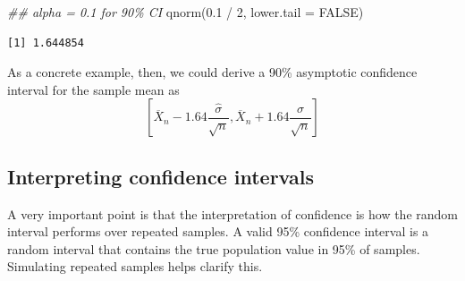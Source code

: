 \documentclass[
  13pt,
  letterpaper,
  DIV=11,
  numbers=noendperiod]{scrreprt}
\newenvironment{Shaded}{\begin{snugshade}}{\end{snugshade}}
\newcommand{\AttributeTok}[1]{\textcolor[rgb]{0.40,0.45,0.13}{#1}}
\newcommand{\ConstantTok}[1]{\textcolor[rgb]{0.56,0.35,0.01}{#1}}
\newcommand{\DecValTok}[1]{\textcolor[rgb]{0.68,0.00,0.00}{#1}}
\newcommand{\DocumentationTok}[1]{\textcolor[rgb]{0.37,0.37,0.37}{\textit{#1}}}
\newcommand{\FloatTok}[1]{\textcolor[rgb]{0.68,0.00,0.00}{#1}}
\newcommand{\FunctionTok}[1]{\textcolor[rgb]{0.28,0.35,0.67}{#1}}
\newcommand{\NormalTok}[1]{\textcolor[rgb]{0.00,0.23,0.31}{#1}}
\newcommand{\SpecialCharTok}[1]{\textcolor[rgb]{0.37,0.37,0.37}{#1}}
\newcommand{\Xbar}{\overline{X}}
\theoremstyle{definition}
\theoremstyle{definition}
\theoremstyle{plain}
\theoremstyle{remark}
\begin{document}
\begin{Shaded}
\begin{Highlighting}[]
\DocumentationTok{\#\# alpha = 0.1 for 90\% CI}
\FunctionTok{qnorm}\NormalTok{(}\FloatTok{0.1} \SpecialCharTok{/} \DecValTok{2}\NormalTok{, }\AttributeTok{lower.tail =} \ConstantTok{FALSE}\NormalTok{)}
\end{Highlighting}
\end{Shaded}

\begin{verbatim}
[1] 1.644854
\end{verbatim}

As a concrete example, then, we could derive a 90\% asymptotic
confidence interval for the sample mean as \[ 
\left[\Xbar_{n} - 1.64 \frac{\widehat{\sigma}}{\sqrt{n}}, \Xbar_{n} + 1.64 \frac{\widehat{\sigma}}{\sqrt{n}}\right]
\]

\subsection{Interpreting confidence
intervals}\label{interpreting-confidence-intervals}

A very important point is that the interpretation of confidence is how
the random interval performs over repeated samples. A valid 95\%
confidence interval is a random interval that contains the true
population value in 95\% of samples. Simulating repeated samples helps
clarify this.
\end{document}
